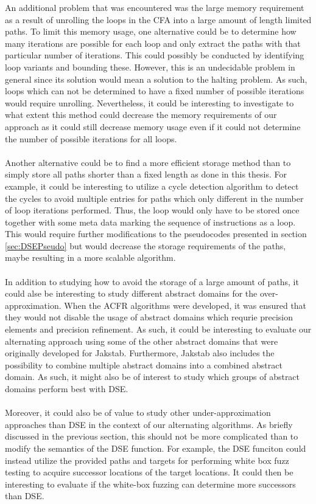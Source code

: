 \documentclass{kththesis}
\begin{document}
An additional problem that was encountered was the large memory requirement as a result of unrolling the loops in the CFA into a large amount of length limited paths. To limit this memory usage, one alternative could be to determine how many iterations are possible for each loop and only extract the paths with that particular number of iterations. This could possibly be conducted by identifying loop variants and bounding these. However, this is an undecidable problem in general since its solution would mean a solution to the halting problem. As such, loops which can not be determined to have a fixed number of possible iterations would require unrolling. Nevertheless, it could be interesting to investigate to what extent this method could decrease the memory requirements of our approach as it could still decrease memory usage even if it could not determine the number of possible iterations for all loops.
\\ \\
Another alternative could be to find a more efficient storage method than to simply store all paths shorter than a fixed length as done in this thesis. For example, it could be interesting to utilize a cycle detection algorithm to detect the cycles to avoid multiple entries for paths which only different in the number of loop iterations performed. Thus, the loop would only have to be stored once together with some meta data marking the sequence of instructions as a loop. This would require further modifications to the pseudocodes presented in section \ref{sec:DSEPseudo} but would decrease the storage requirements of the paths, maybe resulting in a more scalable algorithm.
\\ \\
In addition to studying how to avoid the storage of a large amount of paths, it could alse be interesting to study different abstract domains for the over-approximation. When the ACFR algorithms were developed, it was ensured that they would not disable the usage of abstract domains which requrie precision elements and precision refinement. As such, it could be interesting to evaluate our alternating approach using some of the other abstract domains that were originally developed for Jakstab. Furthermore, Jakstab also includes the possibility to combine multiple abstract domains into a combined abstract domain. As such, it might also be of interest to study which groups of abstract domains perform best  with DSE.
\\ \\
Moreover, it could also be of value to study other under-approximation approaches than DSE in the context of our alternating algorithms. As briefly discussed in the previous section, this should not be more complicated than to modify the semantics of the DSE function. For example, the DSE funciton could instead utilize the provided paths and targets for performing white box fuzz testing\cite{automatedFuzzing} to acquire successor locations of the target locations. It could then be interesting to evaluate if the white-box fuzzing can determine more successors than DSE.
\end{document}
